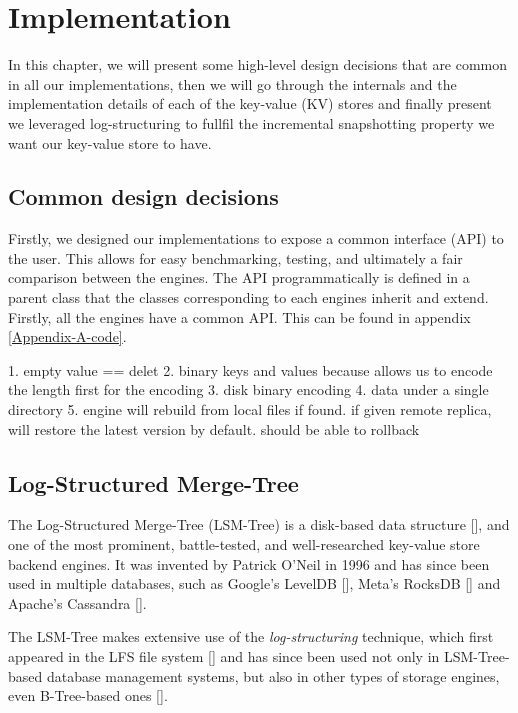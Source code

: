 
\chapter{Implementation}

\label{Chapter3-implementation}

In this chapter, we will present some high-level design decisions that are common in all our implementations, then we will go through the internals and the implementation details of each of the key-value (KV) stores and finally present we leveraged log-structuring to fullfil the incremental snapshotting property we want our key-value store to have.

\section{Common design decisions}

Firstly, we designed our implementations to expose a common interface (API) to the user.
This allows for easy benchmarking, testing, and ultimately a fair comparison between the engines.
The API programmatically is defined in a parent class that the classes corresponding to each engines inherit and extend.
Firstly, all the engines have a common API. This can be found in appendix \ref{Appendix-A-code}.


1. empty value == delet
2. binary keys and values because allows us to encode the length first for the encoding
3. disk binary encoding
4. data under a single directory
5. engine will rebuild from local files if found. if given remote replica, will
restore the latest version by default. should be able to rollback

\section{Log-Structured Merge-Tree}


The Log-Structured Merge-Tree (LSM-Tree) is a disk-based data structure [\cite{lsmtree}], and one of the most prominent, battle-tested, and well-researched key-value store backend engines.
It was invented by Patrick O'Neil in 1996 and has since been used in multiple databases, such as Google's LevelDB [\cite{leveldb}], Meta's RocksDB [\cite{rocksdb}] and Apache's Cassandra [\cite{cassandra}].

The LSM-Tree makes extensive use of the \textit{log-structuring} technique, which first appeared in the LFS file system [\cite{lsm-filesystem}] and has since been used not only in LSM-Tree-based database management systems, but also in other types of storage engines, even B-Tree-based ones [\cite{llama}].

